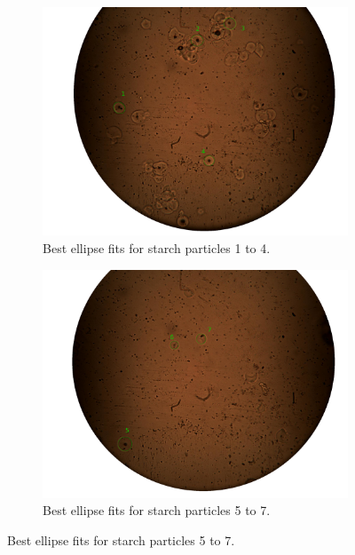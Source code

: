 \begin{figure}[h!]
    \begin{subfigure}[b]{0.475\textwidth}
        \centering
        \includegraphics[width=\textwidth]{afbeeldingen/size/zetmeel/zetmeel_1.png}
        \caption{Best ellipse fits for starch particles 1 to 4.}   
        \label{fig_zetmeel_1}
    \end{subfigure}
    \hspace*{\fill}
    \begin{subfigure}[b]{0.475\textwidth}
        \centering
        \includegraphics[width=\textwidth]{afbeeldingen/size/zetmeel/zetmeel_2.png}
        \caption{Best ellipse fits for starch particles 5 to 7.}   
        \label{fig_zetmeel_2}
    \end{subfigure}
    

\end{figure}
